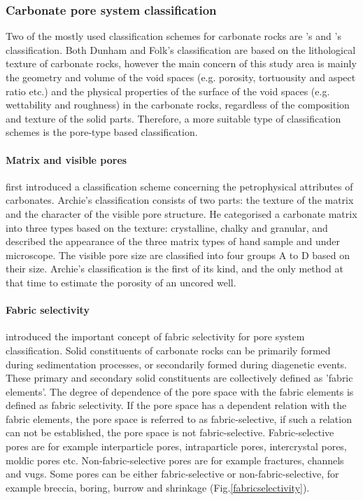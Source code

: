 \subsubsection{Carbonate pore system classification}
Two of the mostly used classification schemes for carbonate rocks are \citet{folk1959practical}'s and \citet{dunham1962classification}'s classification. Both Dunham and Folk's classification are based on the lithological texture of carbonate rocks, however the main concern of this study area is mainly the geometry and volume of the void spaces (e.g. porosity, tortuousity and aspect ratio etc.) and the physical properties of the surface of the void spaces (e.g. wettability and roughness) in the carbonate rocks, regardless of the composition and texture of the solid parts. Therefore, a more suitable type of classification schemes is the pore-type based classification.

\paragraph{Matrix and visible pores}
\citep{archie1952classification} first introduced a classification scheme concerning the petrophysical attributes of carbonates. Archie's classification consists of two parts: the texture of the matrix and the character of the visible pore structure. He categorised a carbonate matrix into three types based on the texture: crystalline, chalky and granular, and described the appearance of the three matrix types of hand sample and under microscope. The visible pore size are classified into four groups A to D based on their size. Archie's classification is the first of its kind, and the only method at that time to estimate the porosity of an uncored well.

\paragraph{Fabric selectivity}
\citet{choquette1970geologic} introduced the important concept of fabric selectivity for pore system classification. Solid constituents of carbonate rocks can be primarily formed during sedimentation processes, or secondarily formed during diagenetic events. These primary and secondary solid constituents are collectively defined as 'fabric elements'. The degree of dependence of the pore space with the fabric elements is defined as fabric selectivity. If the pore space has a dependent relation with the fabric elements, the pore space is referred to as fabric-selective, if such a relation can not be established, the pore space is not fabric-selective. Fabric-selective pores are for example interparticle pores, intraparticle pores, intercrystal pores, moldic pores etc. Non-fabric-selective pores are for example fractures, channels and vugs. Some pores can be either fabric-selective or non-fabric-selective, for example breccia, boring, burrow and shrinkage (Fig.\ref{fabricselectivity}). 

